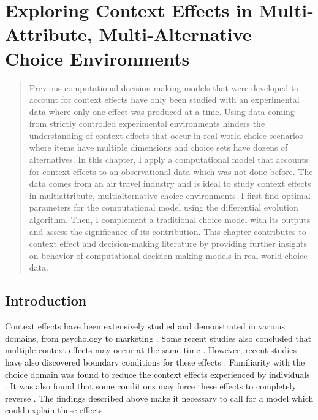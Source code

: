 \documentclass[a4paper,12pt]{article}
\begin{document}
\newpage

\section{Exploring Context Effects in Multi-Attribute, Multi-Alternative Choice Environments}\label{chapter:simulationStudy}
\begin{abstract}
    
    Previous computational decision making models that were developed to account for context effects have only been studied with an experimental data where only one effect was produced at a time. Using data coming from strictly controlled experimental environments hinders the understanding of context effects that occur in real-world choice scenarios where items have multiple dimensions and choice sets have dozens of alternatives. In this chapter, I apply a computational model that accounts for context effects to an observational data which was not done before. The data comes from an air travel industry and is ideal to study context effects in multiattribute, multialternative choice environments. I first find optimal parameters for the computational model using the differential evolution algorithm. Then, I complement a traditional choice model with its outputs and assess the significance of its contribution. This chapter contributes to context effect and decision-making literature by providing further insights on behavior of computational decision-making models in real-world choice data.
    
\end{abstract}

\newpage

\subsection{Introduction}

Context effects have been extensively studied and demonstrated in various domains, from psychology to marketing \citep{herne1997decoy, soltani2012range, truebloodEtAl13, frederickEtAl14, evangelidisEtAl18, wuConsguner20}. Some recent studies also concluded that multiple context effects may occur at the same time \citep{berkowitsch2014rigorously, noguchi2014attraction}. However, recent studies have also discovered boundary conditions for these effects \citep{liew2016appropriacy, spektor2018good, spektor2019similarity}. Familiarity with the choice domain was found to reduce the context effects experienced by individuals \citep{kim2005attraction, sheng2005understanding}.  It was also found that some conditions may force these effects to completely reverse \citep{cataldo2019comparison}. The findings described above make it necessary to call for a model which could explain these effects.
\end{document}
